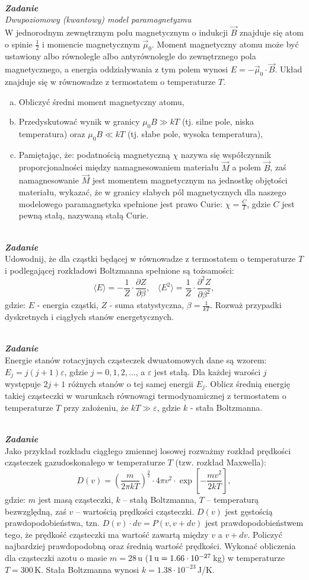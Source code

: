 \documentclass[11pt,a4paper]{article}
\newcounter{zadanie}\newcommand{\zadanie}[1][]{\addtocounter{zadanie}{1} ~\\  {\bf \emph{Zadanie \arabic{zadanie} #1 }} \\}
\begin{document}
\zadanie
{\em Dwupoziomowy (kwantowy) model paramagnetyzmu}\\
W jednorodnym zewnętrznym polu magnetycznym o indukcji $\vec{B}$
znajduje się atom o spinie $\frac{1}{2}$ i momencie magnetycznym $\vec{\mu}_0$.
Moment magnetyczny atomu może być ustawiony albo równolegle albo antyrównolegle do
zewnętrznego pola magnetycznego, a energia oddziaływania z tym polem wynosi
$\displaystyle E = - \vec{\mu}_0 \cdot \vec{B}$.
Układ znajduje się w równowadze z termostatem o temperaturze $T$.
\begin{enumerate}[a)]
\item Obliczyć średni moment magnetyczny atomu,
\item Przedyskutować wynik w granicy $\mu_0 B \gg k T$ (tj. silne pole, niska temperatura) oraz $\mu_0 B \ll k T$ (tj. słabe pole, wysoka temperatura),
\item Pamiętając, że: podatnością magnetyczną $\chi$ nazywa się współczynnik proporcjonalności między namagnesowaniem materiału $\vec{M}$ a polem $\vec{B}$,
zaś namagnesowanie $\vec{M}$ jest momentem magnetycznym na jednostkę 
objętości materiału, wykazać, że w granicy słabych pól magnetycznych dla naszego modelowego paramagnetyka spełnione jest prawo Curie:
$\displaystyle \chi = \frac{C}{T}$,
gdzie $C$ jest pewną stałą, nazywaną stałą Curie.
\end{enumerate}

\zadanie
Udowodnij, że dla cząstki będącej w równowadze z termostatem o temperaturze $T$ i 
podlegającej rozkładowi Boltzmanna spełnione są tożsamości:
\[ \langle E\rangle = - \frac{1}{Z} \cdot \frac{\partial Z}{\partial \beta}, ~~~~
\langle E^2\rangle = \frac{1}{Z} \cdot \frac{\partial^2 Z}{\partial \beta^2}, \]
gdzie: $E$ - energia cząstki, $Z$ - suma statystyczna, $\beta = \frac{1}{k T}$.
Rozważ przypadki dyskretnych i ciągłych stanów energetycznych.

\zadanie
Energie stanów rotacyjnych cząsteczek dwuatomowych dane są wzorem: $E_j = j(j+1)\varepsilon$,
gdzie $j=0,1,2,...$, a $\varepsilon$ jest stałą. 
Dla każdej warości $j$  występuje $2j+1$ różnych stanów o tej samej energii $E_j$. 
Oblicz średnią energię takiej cząsteczki w warunkach równowagi termodynamicznej 
z termostatem o temperaturze $T$ przy założeniu, że $kT \gg \varepsilon$, gdzie $k$ - stała Boltzmanna.


\zadanie
Jako przykład rozkładu ciągłego zmiennej losowej rozważmy
rozkład prędkości cząsteczek gazu\linebreak doskonałego w temperaturze $T$
(tzw. rozkład Maxwella):
\[ D(v) = \left(\frac{m}{2\pi k T}\right)^{\frac{3}{2}}
          \cdot 4 \pi v^2 \cdot\exp\left[ -\frac{m v^2}{2 k T} \right],\]
gdzie: $m$ jest masą cząsteczki, $k$ – stałą Boltzmanna, $T$ – temperaturą bezwzględną, zaś $v$ – wartością prędkości cząsteczki.
$D(v)$ jest gęstością prawdopodobieństwa, tzn. $D(v)\cdot dv = P(v, v+dv)$ jest prawdopodobieństwem tego, że prędkość cząsteczki ma wartość zawartą między
$v$ a $v+dv$. Policzyć najbardziej prawdopodobną oraz średnią wartość prędkości. Wykonać obliczenia dla cząsteczki azotu o masie $m = 28\,$u ($1\,{\rm u} = 1.66\cdot 10^{-27}\,$kg) w temperaturze $T = 300\,$K.
Stała Boltzmanna wynosi $k = 1.38\cdot 10^{-23}\,$J/K.
\newline
\end{document}
